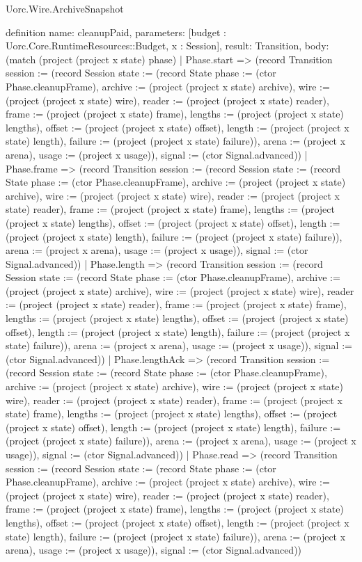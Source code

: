 \begin{lexlean}{Uorc.Wire.ArchiveSnapshot}
\begin{semanticmodule}
definition{
  name: cleanupPaid,
  parameters: [budget : Uorc.Core.RuntimeResources::Budget, x : Session],
  result: Transition,
  body: (match (project (project x state) phase)
    | Phase.start => (record Transition {session := (record Session {state := (record State {phase := (ctor Phase.cleanupFrame), archive := (project (project x state) archive), wire := (project (project x state) wire), reader := (project (project x state) reader), frame := (project (project x state) frame), lengths := (project (project x state) lengths), offset := (project (project x state) offset), length := (project (project x state) length), failure := (project (project x state) failure)}), arena := (project x arena), usage := (project x usage)}), signal := (ctor Signal.advanced)})
    | Phase.frame => (record Transition {session := (record Session {state := (record State {phase := (ctor Phase.cleanupFrame), archive := (project (project x state) archive), wire := (project (project x state) wire), reader := (project (project x state) reader), frame := (project (project x state) frame), lengths := (project (project x state) lengths), offset := (project (project x state) offset), length := (project (project x state) length), failure := (project (project x state) failure)}), arena := (project x arena), usage := (project x usage)}), signal := (ctor Signal.advanced)})
    | Phase.length => (record Transition {session := (record Session {state := (record State {phase := (ctor Phase.cleanupFrame), archive := (project (project x state) archive), wire := (project (project x state) wire), reader := (project (project x state) reader), frame := (project (project x state) frame), lengths := (project (project x state) lengths), offset := (project (project x state) offset), length := (project (project x state) length), failure := (project (project x state) failure)}), arena := (project x arena), usage := (project x usage)}), signal := (ctor Signal.advanced)})
    | Phase.lengthAck => (record Transition {session := (record Session {state := (record State {phase := (ctor Phase.cleanupFrame), archive := (project (project x state) archive), wire := (project (project x state) wire), reader := (project (project x state) reader), frame := (project (project x state) frame), lengths := (project (project x state) lengths), offset := (project (project x state) offset), length := (project (project x state) length), failure := (project (project x state) failure)}), arena := (project x arena), usage := (project x usage)}), signal := (ctor Signal.advanced)})
    | Phase.read => (record Transition {session := (record Session {state := (record State {phase := (ctor Phase.cleanupFrame), archive := (project (project x state) archive), wire := (project (project x state) wire), reader := (project (project x state) reader), frame := (project (project x state) frame), lengths := (project (project x state) lengths), offset := (project (project x state) offset), length := (project (project x state) length), failure := (project (project x state) failure)}), arena := (project x arena), usage := (project x usage)}), signal := (ctor Signal.advanced)})
}
\end{semanticmodule}
\end{lexlean}
